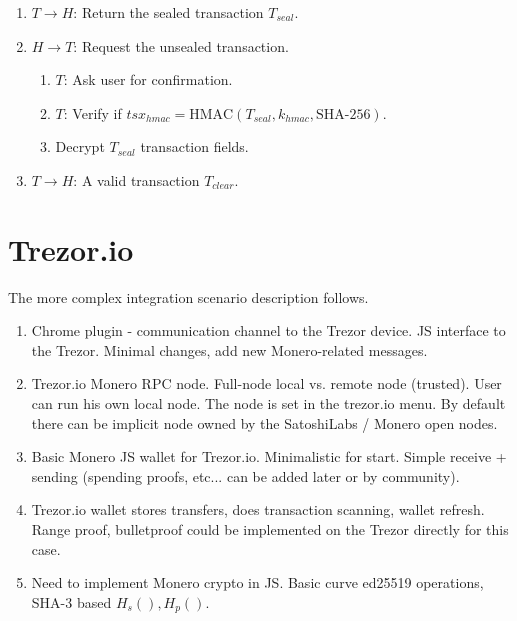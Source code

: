 \documentclass[]{article}
\begin{document}
\begin{enumerate}
	\item $T \rightarrow H$: Return the sealed transaction $T_{seal}$.
		
	\item $H \rightarrow T$: Request the unsealed transaction.
	\begin{enumerate}
		\item $T$: Ask user for confirmation.
		\item $T$: Verify if $tsx_{hmac} = \text{HMAC}(T_{seal}, k_{hmac}, \text{SHA-256})$.
		\item Decrypt $T_{seal}$ transaction fields.
	\end{enumerate}
	\item $T \rightarrow H$: A valid transaction $T_{clear}$.
	
\end{enumerate}


\section{Trezor.io}

The more complex integration scenario description follows.
\begin{enumerate}
	\item Chrome plugin - communication channel to the Trezor device. 
	JS interface to the Trezor. Minimal changes, add new Monero-related messages.
	
	\item Trezor.io Monero RPC node. Full-node local vs. remote node (trusted). User can run his own local node. The node is set in the trezor.io menu. By default there can be implicit node owned by the SatoshiLabs / Monero open nodes.
	
	\item Basic Monero JS wallet for Trezor.io. Minimalistic for start. Simple receive + sending (spending proofs, etc... can be added later or by community). 
	
	\item Trezor.io wallet stores transfers, does transaction scanning, wallet refresh. Range proof, bulletproof could be implemented on the Trezor directly for this case. 
	 
	\item Need to implement Monero crypto in JS. Basic curve ed25519 operations, SHA-3 based $H_s(), H_p()$.
	 
\end{enumerate}
\end{document}
